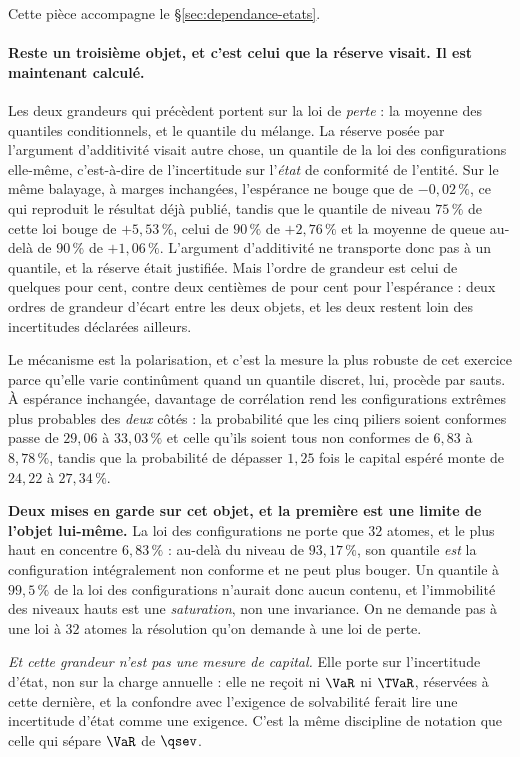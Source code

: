 
Cette pièce accompagne le \S\ref{sec:dependance-etats}.

\paragraph{Reste un troisième objet, et c'est celui que la réserve visait. Il est maintenant
calculé.} Les deux grandeurs qui précèdent portent sur la loi de \emph{perte} : la moyenne des
quantiles conditionnels, et le quantile du mélange. La réserve posée par l'argument d'additivité
visait autre chose, un quantile de la loi des configurations elle-même, c'est-à-dire de
l'incertitude sur l'\emph{état} de conformité de l'entité. Sur le même balayage, à marges
inchangées, l'espérance ne bouge que de $-0{,}02\,\%$, ce qui reproduit le résultat déjà publié,
tandis que le quantile de niveau $75\,\%$ de cette loi bouge de $+5{,}53\,\%$, celui de $90\,\%$
de $+2{,}76\,\%$ et la moyenne de queue au-delà de $90\,\%$ de $+1{,}06\,\%$. L'argument
d'additivité ne transporte donc pas à un quantile, et la réserve était justifiée. Mais l'ordre
de grandeur est celui de quelques pour cent, contre deux centièmes de pour cent pour l'espérance :
deux ordres de grandeur d'écart entre les deux objets, et les deux restent loin des incertitudes
déclarées ailleurs.

Le mécanisme est la polarisation, et c'est la mesure la plus robuste de cet exercice
parce qu'elle varie continûment quand un quantile discret, lui, procède par sauts. À espérance
inchangée, davantage de corrélation rend les configurations extrêmes plus probables des
\emph{deux} côtés : la probabilité que les cinq piliers soient conformes passe de $29{,}06$ à
$33{,}03\,\%$ et celle qu'ils soient tous non conformes de $6{,}83$ à $8{,}78\,\%$, tandis que la
probabilité de dépasser $1{,}25$ fois le capital espéré monte de $24{,}22$ à $27{,}34\,\%$.

\begin{attention}
\textbf{Deux mises en garde sur cet objet, et la première est une limite de l'objet lui-même.}
La loi des configurations ne porte que $32$ atomes, et le plus haut en concentre $6{,}83\,\%$ :
au-delà du niveau de $93{,}17\,\%$, son quantile \emph{est} la configuration intégralement non
conforme et ne peut plus bouger. Un \og{}quantile à $99{,}5\,\%$ de la loi des
configurations\fg{} n'aurait donc aucun contenu, et l'immobilité des niveaux hauts est une
\emph{saturation}, non une invariance. On ne demande pas à une loi à $32$ atomes la résolution
qu'on demande à une loi de perte.

\emph{Et cette grandeur n'est pas une mesure de capital.} Elle porte sur l'incertitude d'état,
non sur la charge annuelle : elle ne reçoit ni $\VaR$ ni $\TVaR$, réservées à cette dernière, et
la confondre avec l'exigence de solvabilité ferait lire une incertitude d'état comme une
exigence. C'est la même discipline de notation que celle qui sépare $\VaR$ de $\qsev$.
\end{attention}

